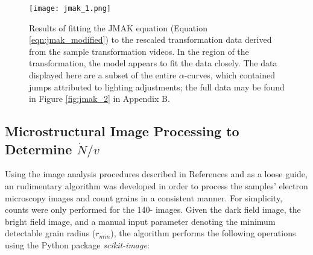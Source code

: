 	\begin{figure}[h]
		\centering
		\texttt{[image: jmak\_1.png]}
		\caption{Results of fitting the JMAK equation (Equation \ref{eqn:jmak_modified}) to the rescaled transformation data derived from the sample transformation videos.  In the region of the transformation, the model appears to fit the data closely.  The data displayed here are a subset of the entire $\alpha$-curves, which contained jumps attributed to lighting adjustments; the full data may be found in Figure \ref{fig:jmak_2} in Appendix B.}
		\label{fig:jmak_1}
	\end{figure}

\subsection{Microstructural Image Processing to Determine $\dot{N}/v$}

Using the image analysis procedures described in References \cite{chan:2020} and \cite{campbell:2018} as a loose guide, an rudimentary algorithm was developed in order to process the samples' electron microscopy images and count grains in a consistent manner.  For simplicity, counts were only performed for the 140- images.  Given the dark field image, the bright field image, and a manual input parameter denoting the minimum detectable grain radius ($r_{min}$), the algorithm performs the following operations using the Python package \textit{scikit-image}\cite{skimage}:

